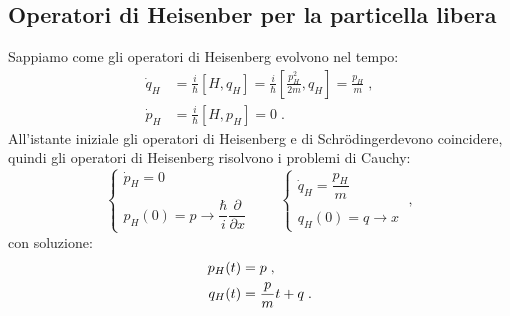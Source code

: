 \documentclass[10pt,a4paper]{report}
\theoremstyle{definition}
\numberwithin{equation}{section}
\newcommand{\Sch}{Schrödinger}
\begin{document}
\subsection{Operatori di Heisenber per la particella libera}
Sappiamo come gli operatori di Heisenberg evolvono nel tempo:
\begin{align*}
\dot{q}_H &=\frac{i}{\hbar}[H,q_H]=\frac{i}{\hbar}\left[\frac{p_H^2}{2m},q_H\right]=\frac{p_H}{m}\;, \\
\dot{p}_H &= \frac{i}{\hbar}[H,p_H]=0\;.
\end{align*}
All'istante iniziale gli operatori di Heisenberg e di \Sch\;devono coincidere, quindi gli operatori di Heisenberg risolvono i problemi di Cauchy:
\begin{equation}
\begin{cases}
\dot{p}_H=0 \\
\\
p_H(0)=p \rightarrow \dfrac{\hbar}{i}\dfrac{\partial}{\partial x}
\end{cases} \qquad 
\begin{cases}
\dot{q}_H=\dfrac{p_H}{m} \\
\\
q_H(0)=q \rightarrow x
\end{cases}\;,
\end{equation}
con soluzione:
\begin{align}
p_H(t)&=p \notag\;, \\
q_H(t)&= \frac{p}{m}t+q\;.
\end{align}
\end{document}
